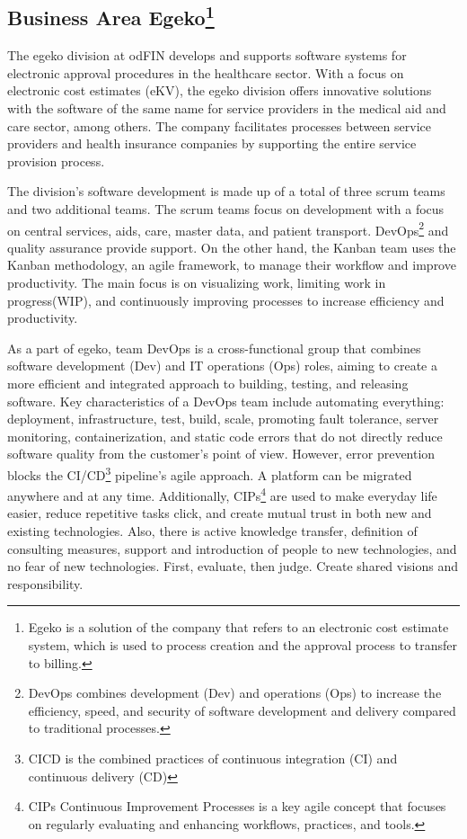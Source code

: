 \subsection{Business Area Egeko\protect\footnote{Egeko is a solution of the company that refers to an electronic cost estimate system, which is used to process creation and the approval process to transfer to billing.}}

The egeko division at odFIN develops and supports software systems for electronic approval procedures in the healthcare sector. With a focus on electronic cost estimates (eKV), the egeko division offers innovative solutions with the software of the same name for service providers in the medical aid and care sector, among others. The company facilitates processes between service providers and health insurance companies by supporting the entire service provision process.\vspace{.4cm}

The division's software development is made up of a total of three scrum teams and two additional teams. The scrum teams focus on development with a focus on central services, aids, care, master data, and patient transport. DevOps\footnote{DevOps combines development (Dev) and operations (Ops) to increase the efficiency, speed, and security of software development and delivery compared to traditional processes.} and quality assurance provide support. On the other hand, the Kanban team uses the Kanban methodology, an agile framework, to manage their workflow and improve productivity. The main focus is on visualizing work, limiting work in progress(WIP), and continuously improving processes to increase efficiency and productivity. \vspace{.4cm} 

As a part of egeko, team DevOps is a cross-functional group that combines software development (Dev) and IT operations (Ops) roles, aiming to create a more efficient and integrated approach to building, testing, and releasing software. Key characteristics of a DevOps team include automating everything: deployment, infrastructure, test, build, scale, promoting fault tolerance, server monitoring, containerization, and static code errors that do not directly reduce software quality from the customer's point of view. However, error prevention blocks the CI/CD\footnote{CICD is the combined practices of continuous integration (CI) and continuous delivery (CD)} pipeline's agile approach. A platform can be migrated anywhere and at any time. Additionally, CIPs\footnote{CIPs Continuous Improvement Processes is a key agile concept that focuses on regularly evaluating and enhancing workflows, practices, and tools.} are used to make everyday life easier, reduce repetitive tasks click, and create mutual trust in both new and existing technologies. Also, there is active knowledge transfer, definition of consulting measures, support and introduction of people to new technologies, and no fear of new technologies. First, evaluate, then judge. Create shared visions and responsibility. \vspace{.4cm}

